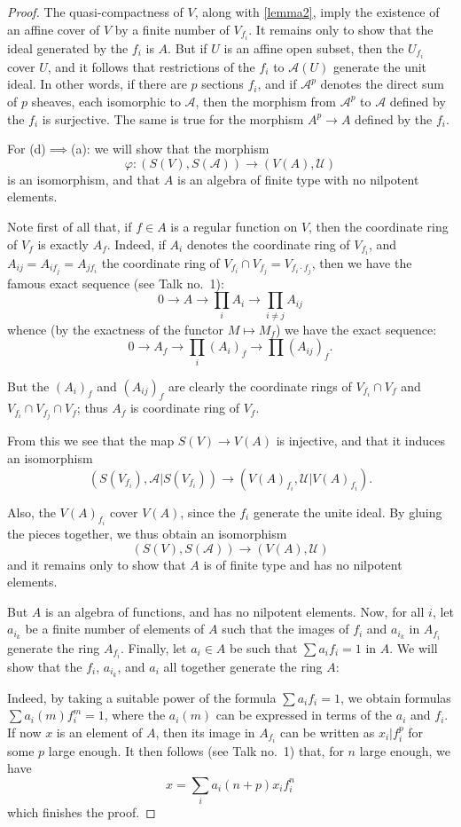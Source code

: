 \documentclass{article}
\theoremstyle{plain}
\theoremstyle{definition}
\newcommand{\sh}{\mathscr}
\newcommand{\oldpage}[1]{\marginpar{\footnotesize$\Big\vert$ \textit{p.~#1}}}
\begin{document}
\begin{proof}
  The quasi-compactness of $V$, along with \cref{lemma2}, imply the existence of an affine cover of $V$ by a finite number of $V_{f_i}$.
  It remains only to show that the ideal generated by the $f_i$ is $A$.
  But if $U$ is an affine open subset, then the $U_{f_i}$ cover $U$, and it follows that restrictions of the $f_i$ to $\sh{A}(U)$ generate the unit ideal.
  In other words, if there are $p$ sections $f_i$, and if $\sh{A}^p$ denotes the direct sum of $p$ sheaves, each isomorphic to $\sh{A}$, then the morphism from $\sh{A}^p$ to $\sh{A}$ defined by the $f_i$ is surjective.
  The same is true for the morphism $A^p\to A$ defined by the $f_i$.

  \bigskip

  For (d)$\implies$(a):
  we will show that the morphism
  \[
    \varphi\colon (S(V),S(\sh{A})) \to (V(A),\sh{U})
  \]
  is an isomorphism, and that $A$ is an algebra of finite type with no nilpotent elements.

  Note first of all that, if $f\in A$ is a regular function on $V$, then the coordinate ring of $V_f$ is exactly $A_f$.
  Indeed, if $A_i$ denotes the coordinate ring of $V_{f_i}$, and $A_{ij}=A_{if_j}=A_{jf_i}$ the coordinate ring of $V_{f_i}\cap V_{f_j}=V_{f_i\cdot f_j}$, then we have the famous exact sequence (see Talk no.~1):
  \[
    0 \to A \to \prod_i A_i \to \prod_{i\neq j}A_{ij}
  \]
  whence (by the exactness of the functor $M\mapsto M_f$) we have the exact sequence:
  \[
    0 \to A_f \to \prod_i(A_i)_f \to \prod(A_{ij})_f.
  \]

  But the $(A_i)_f$ and $(A_{ij})_f$ are clearly the coordinate rings of
\oldpage{2-07}
  $V_{f_i}\cap V_f$ and $V_{f_i}\cap V_{f_j}\cap V_f$;
  thus $A_f$ is coordinate ring of $V_f$.

  From this we see that the map $S(V)\to V(A)$ is injective, and that it induces an isomorphism
  \[
    (S(V_{f_i}), \sh{A}|S(V_{f_i})) \to (V(A)_{f_i}, \sh{U}|V(A)_{f_i}).
  \]

  Also, the $V(A)_{f_i}$ cover $V(A)$, since the $f_i$ generate the unite ideal.
  By gluing the pieces together, we thus obtain an isomorphism
  \[
    (S(V),S(\sh{A})) \to (V(A),\sh{U})
  \]
  and it remains only to show that $A$ is of finite type and has no nilpotent elements.

  But $A$ is an algebra of functions, and has no nilpotent elements.
  Now, for all $i$, let $a_{i_k}$ be a finite number of elements of $A$ such that the images of $f_i$ and $a_{i_k}$ in $A_{f_i}$ generate the ring $A_{f_i}$.
  Finally, let $a_i\in A$ be such that $\sum a_i f_i=1$ in $A$.
  We will show that the $f_i$, $a_{i_k}$, and $a_i$ all together generate the ring $A$:

  Indeed, by taking a suitable power of the formula $\sum a_i f_i=1$, we obtain formulas $\sum a_i(m)f_i^m=1$, where the $a_i(m)$ can be expressed in terms of the $a_i$ and $f_i$.
  If now $x$ is an element of $A$, then its image in $A_{f_i}$ can be written as $x_i|f_i^p$ for some $p$ large enough.
  It then follows (see Talk no.~1) that, for $n$ large enough, we have
  \[
    x = \sum_i a_i(n+p) x_i f_i^n
  \]
  which finishes the proof.
\end{proof}
\end{document}

